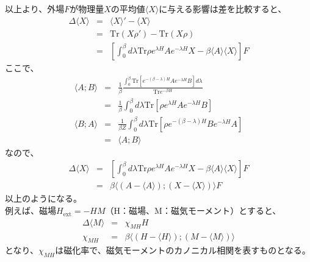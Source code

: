 \documentclass[10pt]{ujarticle}
\begin{document}
以上より、外場$F$が物理量$X$の平均値$\langle X \rangle$に与える影響は差を比較すると、
\begin{eqnarray*}
  \Delta \langle X \rangle &=& \langle X \rangle' - \langle X \rangle \\
  &=& \mathrm{Tr} (X \rho') - \mathrm{Tr} (X \rho)\\
  &=& \left[ \int^{\beta}_0 d\lambda \mathrm{Tr} \rho e^{\lambda H} A e^{-\lambda H} X - \beta \langle A \rangle \langle X \rangle \right] F
\end{eqnarray*}
ここで、
\begin{eqnarray*}
  \langle A;B \rangle &=& \frac{1}{\beta} \frac{\int^{\beta}_0 \mathrm{Tr}\left[ e^{-(\beta-\lambda)H} A e^{-\lambda H} B \right] d\lambda}{\mathrm{Tr}e^{-\beta H}}\\
  &=& \frac{1}{\beta} \int^{\beta}_0 d\lambda \mathrm{Tr}\left[ \rho e^{\lambda H} A e^{-\lambda H} B\right] \\
  \langle B;A \rangle &=& \frac{1}{\beta Z} \int^{\beta}_0 d\lambda \mathrm{Tr}\left[ \rho e^{-(\beta-\lambda) H} B e^{-\lambda H} A\right]\\
  &=& \langle A;B \rangle
\end{eqnarray*}
なので、
\begin{eqnarray*}
  \Delta \langle X \rangle &=& \left[ \int^{\beta}_0 d\lambda \mathrm{Tr} \rho e^{\lambda H} A e^{-\lambda H} X - \beta \langle A \rangle \langle X \rangle \right]F\\
  &=& \beta \langle \left(A-\langle A \rangle \right); \left(X-\langle X \rangle \right) \rangle F
\end{eqnarray*}
以上のようになる。\\
例えば、磁場$H_{\mathrm{ext}}=-HM$（H：磁場、M：磁気モーメント）とすると、
\begin{eqnarray*}
  \Delta \langle M \rangle &=& \chi_{MH} H\\
  \chi_{MH} &=& \beta \langle \left(H-\langle H \rangle \right); \left(M-\langle M \rangle \right) \rangle
\end{eqnarray*}
となり、$\chi_{MH}$は磁化率で、磁気モーメントのカノニカル相関を表すものとなる。
\end{document}
